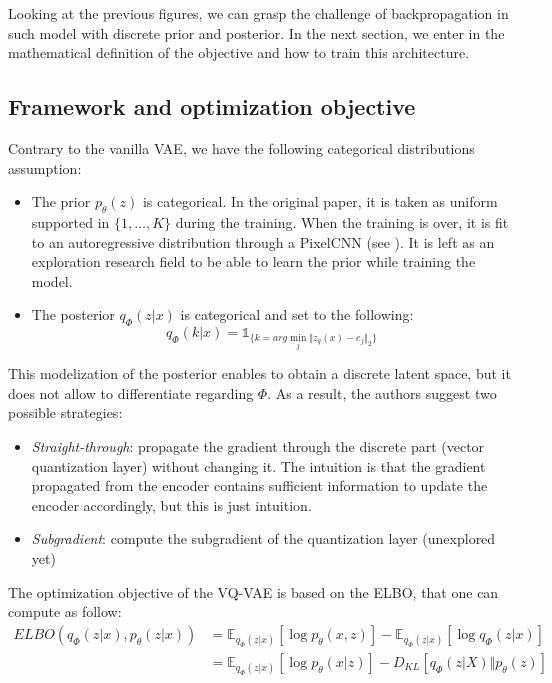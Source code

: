 Looking at the previous figures, we can grasp the challenge of backpropagation in such model with discrete prior and posterior.
In the next section, we enter in the mathematical definition of the objective and how to train this architecture.

\subsection{Framework and optimization objective}

Contrary to the vanilla VAE, we have the following categorical distributions assumption:
\begin{itemize}
    \item The prior $p_{\theta}(z)$ is categorical.
          In the original paper, it is taken as uniform supported in $\{1, \dots, K\}$ during the training.
          When the training is over, it is fit to an autoregressive distribution through a PixelCNN (see \cite{pixel_cnn_paper}).
          It is left as an exploration research field to be able to learn the prior while training the model.
    \item The posterior $q_{\Phi}(z|x)$ is categorical and set to the following:
          $$
          q_{\Phi}(k|x) = \mathds{1}_{\{k = arg\min_{j} \Vert z_q(x) - e_j \Vert_2\}}
          $$
\end{itemize}

This modelization of the posterior enables to obtain a discrete latent space, but it does not allow to differentiate regarding $\Phi$.
As a result, the authors suggest two possible strategies:
\begin{itemize}
    \item \textit{Straight-through}: propagate the gradient through the discrete part (vector quantization layer) without changing it.
          The intuition is that the gradient propagated from the encoder contains sufficient information to update the encoder accordingly, but this is just intuition.
    \item \textit{Subgradient}: compute the subgradient of the quantization layer (unexplored yet)
\end{itemize}

The optimization objective of the VQ-VAE is based on the ELBO, that one can compute as follow:
$$
\begin{align}
    ELBO(q_{\Phi}(z|x), p_{\theta}(z|x)) &= \mathbb{E}_{q_{\Phi}(z|x)}[\log p_{\theta}(x,z)] - \mathbb{E}_{q_{\Phi}(z|x)}[\log q_{\Phi}(z|x)] \\
    &= \mathbb{E}_{q_{\Phi}(z|x)}[\log p_{\theta}(x|z)] - D_{KL}[q_{\Phi}(z|X) \Vert p_{\theta}(z)]
\end{align}
$$

